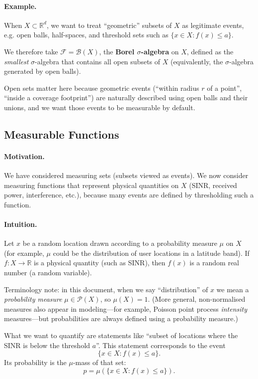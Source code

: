 \paragraph{Example.}
When $X\subset \mathbb{R}^d$, we want
to treat ``geometric'' subsets of $X$ as legitimate events, e.g. open balls, half-spaces,
and threshold sets such as $\{x\in X : f(x)\le a\}$.

We therefore take $\mathcal{F}=\mathcal{B}(X)$, the \textbf{Borel $\sigma$-algebra} on $X$,
defined as the \emph{smallest} $\sigma$-algebra that contains all open subsets of $X$
(equivalently, the $\sigma$-algebra generated by open balls).

Open sets matter here because geometric events (``within radius $r$ of a point'', 
``inside a coverage footprint'') are naturally described using open balls and their unions, 
and we want those events to be measurable by default.

\subsection{Measurable Functions}

\paragraph{Motivation.}
We have considered measuring sets (subsets viewed as events). We now consider measuring functions
that represent physical quantities on $X$ (SINR, received power, interference, etc.), because many events
are defined by thresholding such a function.

\paragraph{Intuition.}
Let $x$ be a random location drawn according to a probability measure $\mu$ on $X$
(for example, $\mu$ could be the distribution of user locations in a latitude band).
If $f:X\to\mathbb{R}$ is a physical quantity (such as SINR), then $f(x)$ is a random real number (a random variable).

Terminology note: in this document, when we say ``distribution'' of $x$ we mean a \emph{probability measure}
$\mu\in\mathcal{P}(X)$, so $\mu(X)=1$. (More general, non-normalised measures also appear in modeling---for example,
Poisson point process \emph{intensity} measures---but probabilities are always defined using a probability measure.)

What we want to quantify are statements like ``subset of locations where the SINR is below the threshold $a$''.
This statement corresponds to the event 
$$
\{x\in X : f(x)\le a\}.
$$
Its probability is the $\mu$-mass of that set:
$$
p = \mu(\{x\in X : f(x)\le a\}).
$$

